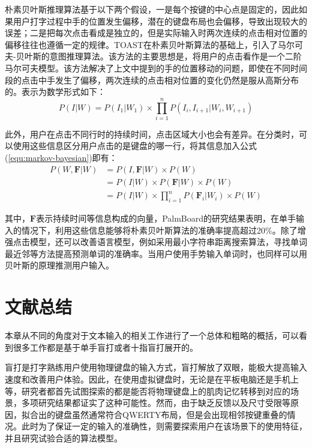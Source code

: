 朴素贝叶斯推理算法基于以下两个假设，一是每个按键的中心点是固定的，因此如果用户打字过程中手的位置发生偏移，潜在的键盘布局也会偏移，导致出现较大的误差；二是把每次点击看成是独立的，但是实际输入时两次连续的点击相对位置的偏移往往也遵循一定的规律\cite{2018shitoast}。TOAST\cite{2018shitoast}在朴素贝叶斯算法的基础上，引入了马尔可夫-贝叶斯的意图推理算法。该方法的主要思想是，将用户的点击看作是一个二阶马尔可夫模型。该方法解决了上文中提到的手的位置移动的问题，即使在不同时间段的点击中手发生了偏移，两次连续的点击相对位置的变化仍然是服从高斯分布的。表示为数学形式如下：
\begin{equation}
    \label{equ:markov-bayesian}
    P(I|W) = P(I_1|W_1) \times \prod_{i=1}^{n}P(I_i, I_{i+1}|W_i, W_{i+1})
\end{equation}

此外，用户在点击不同行时的持续时间，点击区域大小也会有差异。在分类时，可以使用这些信息区分用户点击的是键盘的哪一行，将其信息加入公式(\ref{equ:markov-bayesian})即有：
\begin{equation}
    \begin{aligned}
        P(W, \textbf{F}|W) &= P(I,\textbf{F}|W) \times P(W) \\ 
        &= P(I|W) \times P(\textbf{F}|W) \times P(W) \\ &= P(I|W) \times \prod_{i=1}^{n}P(\textbf{F}_{i}|W_{i}) \times P(W)
    \end{aligned} 
\end{equation}

其中，$\textbf{F}$表示持续时间等信息构成的向量，PalmBoard\cite{palmboard2020}的研究结果表明，在单手输入的情况下，利用这些信息能够将朴素贝叶斯算法的准确率提高超过20\%。除了增强点击模型，还可以改善语言模型，例如采用最小字符串距离搜索算法\cite{tinwala2010eyes}，寻找单词最近邻\cite{bunke1993fast}等方法提高预测单词的准确率。当用户使用手势输入单词时，也同样可以用贝叶斯的原理推测用户输入\cite{zhai2012word}。

\section{文献总结}
本章从不同的角度对于文本输入的相关工作进行了一个总体和粗略的概括，可以看到很多工作都是基于单手盲打或者十指盲打展开的。

盲打是打字熟练用户使用物理键盘的输入方式，盲打解放了双眼，能极大提高输入速度和改善用户体验。因此，在使用虚拟键盘时，无论是在平板电脑还是手机上等，研究者都首先试图探索的都是能否将物理键盘上的肌肉记忆转移到对应的场景，多项研究结果都证实了这种可能性\cite{2017blindtype}\cite{2018shitoast}\cite{zhu2018typing}\cite{palmboard2020}。然而，由于缺乏反馈以及尺寸受限等原因，拟合出的键盘虽然通常符合QWERTY布局，但是会出现相邻按键重叠的情况。此时为了保证一定的输入的准确性，则需要探索用户在该场景下的使用特征，并且研究试验合适的算法模型。


